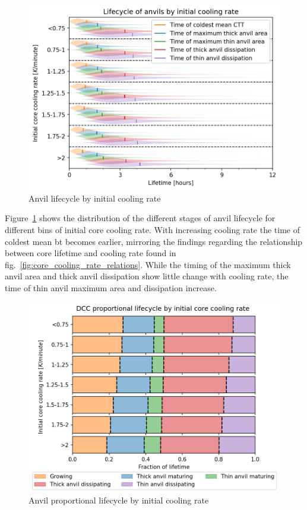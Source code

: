 \begin{figure}[tp]
    \centering
    \includegraphics[width=\textwidth]{figures/ch2_22.png}
    \caption{Anvil lifecycle by initial cooling rate}
    \label{fig:anvil_cooling_rate_lifecycle}
\end{figure}

Figure~\ref{fig:anvil_cooling_rate_lifecycle} shows the distribution of the different stages of anvil lifecycle for different bins of initial core cooling rate.
With increasing cooling rate the time of coldest mean \acrshort{bt} becomes earlier, mirroring the findings regarding the relationship between core lifetime and cooling rate found in fig.~\ref{fig:core_cooling_rate_relations}.
While the timing of the maximum thick anvil area and thick anvil dissipation show little change with cooling rate, the time of thin anvil maximum area and dissipation increase.


\begin{figure}[tp]
    \centering
    \includegraphics[width=\textwidth]{figures/ch2_23.png}
    \caption{Anvil proportional lifecycle by initial cooling rate}
    \label{fig:anvil_cooling_rate_proportional_lifecycle}
\end{figure}

